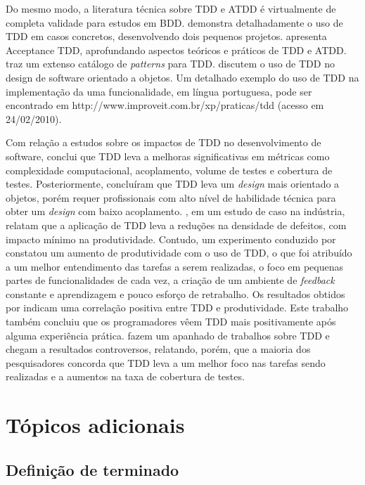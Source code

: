 \documentclass[a4paper,abntfigtabnum,noindentfirst]{abnt}
\begin{document}
Do mesmo modo, a literatura técnica sobre TDD e ATDD é virtualmente de completa validade para estudos em BDD.   demonstra detalhadamente o uso de TDD em casos concretos, desenvolvendo dois pequenos projetos.  apresenta Acceptance TDD, aprofundando aspectos teóricos e práticos de TDD e ATDD.  traz um extenso catálogo de \textit{patterns} para TDD.  discutem o uso de TDD no design de software orientado a objetos. Um detalhado exemplo do uso de TDD na implementação da uma funcionalidade, em língua portuguesa, pode ser encontrado em http://www.improveit.com.br/xp/praticas/tdd (acesso em 24/02/2010).

Com relação a estudos sobre os impactos de TDD no desenvolvimento de software,  conclui que TDD leva a melhoras significativas em métricas como complexidade computacional, acoplamento, volume de testes e cobertura de testes. Posteriormente,  concluíram que TDD leva um \textit{design} mais orientado a objetos, porém requer profissionais com alto nível de habilidade técnica para obter um \textit{design} com baixo acoplamento. , em um estudo de caso na indústria, relatam que a aplicação de TDD leva a reduções na densidade de defeitos, com impacto mínimo na produtividade. Contudo, um experimento conduzido por  constatou um aumento de produtividade com o uso de TDD, o que foi atribuído a um melhor entendimento das tarefas a serem realizadas, o foco em pequenas partes de funcionalidades de cada vez, a criação de um ambiente de \textit{feedback} constante e aprendizagem e pouco esforço de retrabalho. Os resultados obtidos por  indicam uma correlação positiva entre TDD e produtividade. Este trabalho também concluiu que os programadores vêem TDD mais positivamente após alguma experiência prática.  fazem um apanhado de trabalhos sobre TDD e chegam a resultados controversos, relatando, porém, que a maioria dos pesquisadores concorda que TDD leva a um melhor foco nas tarefas sendo realizadas e a aumentos na taxa de cobertura de testes.

\section*{Tópicos adicionais}

\subsection*{Definição de terminado}
\end{document}
